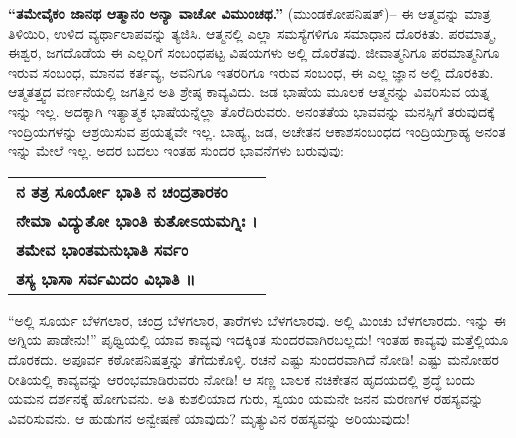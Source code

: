 \textbf{“ತಮೇವೈಕಂ ಜಾನಥ ಆತ್ಮಾನಂ ಅನ್ಯಾ ವಾಚೋ ವಿಮುಂಚಥ.”} (ಮುಂಡಕೋಪನಿಷತ್​)– ಈ ಆತ್ಮವನ್ನು ಮಾತ್ರ ತಿಳಿಯಿರಿ, ಉಳಿದ ವ್ಯರ್ಥಾಲಾಪವನ್ನು ತ್ಯಜಿಸಿ. ಆತ್ಮನಲ್ಲಿ ಎಲ್ಲಾ ಸಮಸ್ಯೆಗಳಿಗೂ ಸಮಾಧಾನ ದೊರಕಿತು. ಪರಮಾತ್ಮ, ಈಶ್ವರ, ಜಗದೊಡೆಯ ಈ ಎಲ್ಲರಿಗೆ ಸಂಬಂಧಪಟ್ಟ ವಿಷಯಗಳು ಅಲ್ಲಿ ದೊರೆತವು. ಜೀವಾತ್ಮನಿಗೂ ಪರಮಾತ್ಮನಿಗೂ ಇರುವ ಸಂಬಂಧ, ಮಾನವ ಕರ್ತವ್ಯ, ಅವನಿಗೂ ಇತರರಿಗೂ ಇರುವ ಸಂಬಂಧ, ಈ ಎಲ್ಲ ಜ್ಞಾನ ಅಲ್ಲಿ ದೊರಕಿತು. ಆತ್ಮತತ್ತ್ವದ ವರ್ಣನೆಯಲ್ಲಿ ಜಗತ್ತಿನ ಅತಿ ಶ್ರೇಷ್ಠ ಕಾವ್ಯವಿದು. ಜಡ ಭಾಷೆಯ ಮೂಲಕ ಆತ್ಮನನ್ನು ವಿವರಿಸುವ ಯತ್ನ ಇನ್ನು ಇಲ್ಲ. ಅದಕ್ಕಾಗಿ ಇತ್ಯಾತ್ಮಕ  ಭಾಷೆಯನ್ನೆಲ್ಲಾ ತೊರೆದಿರುವರು. ಅನಂತತೆಯ ಭಾವವನ್ನು ಮನಸ್ಸಿಗೆ ತರುವುದಕ್ಕೆ ಇಂದ್ರಿಯಗಳನ್ನು ಆಶ್ರಯಿಸುವ ಪ್ರಯತ್ನವೇ ಇಲ್ಲ. ಬಾಹ್ಯ, ಜಡ, ಅಚೇತನ ಆಕಾಶಸಂಬಂಧದ ಇಂದ್ರಿಯಗ್ರಾಹ್ಯ ಅನಂತ ಇನ್ನು ಮೇಲೆ ಇಲ್ಲ. ಅದರ ಬದಲು ಇಂತಹ ಸುಂದರ ಭಾವನೆಗಳು ಬರುವುವು:

\begin{longtable}[r]{@{}l@{}}
\textbf{ನ ತತ್ರ ಸೂರ್ಯೋ ಭಾತಿ ನ ಚಂದ್ರತಾರಕಂ} \\
\textbf{ನೇಮಾ ವಿದ್ಯುತೋ ಭಾಂತಿ ಕುತೋಽಯಮಗ್ನಿಃ ।} \\
\textbf{ತಮೇವ ಭಾಂತಮನುಭಾತಿ ಸರ್ವಂ} \\
\textbf{ತಸ್ಯ ಭಾಸಾ ಸರ್ವಮಿದಂ ವಿಭಾತಿ ॥} \\
\end{longtable}

“ಅಲ್ಲಿ ಸೂರ್ಯ ಬೆಳಗಲಾರ, ಚಂದ್ರ ಬೆಳಗಲಾರ, ತಾರೆಗಳು ಬೆಳಗಲಾರವು. ಅಲ್ಲಿ ಮಿಂಚು ಬೆಳಗಲಾರದು. ಇನ್ನು ಈ ಅಗ್ನಿಯ ಪಾಡೇನು!” ಪೃಥ್ವಿಯಲ್ಲಿ ಯಾವ ಕಾವ್ಯವು ಇದಕ್ಕಿಂತ ಸುಂದರವಾಗಿರಬಲ್ಲದು! ಇಂತಹ ಕಾವ್ಯವು ಮತ್ತೆಲ್ಲಿಯೂ ದೊರಕದು. ಅಪೂರ್ವ ಕಠೋಪನಿಷತ್ತನ್ನು ತೆಗೆದುಕೊಳ್ಳಿ. ರಚನೆ ಎಷ್ಟು ಸುಂದರವಾಗಿದೆ ನೋಡಿ! ಎಷ್ಟು ಮನೋಹರ ರೀತಿಯಲ್ಲಿ ಕಾವ್ಯವನ್ನು ಆರಂಭಮಾಡಿರುವರು ನೋಡಿ! ಆ ಸಣ್ಣ ಬಾಲಕ ನಚಿಕೇತನ ಹೃದಯದಲ್ಲಿ ಶ್ರದ್ಧೆ ಬಂದು ಯಮನ ದರ್ಶನಕ್ಕೆ ಹೋಗುವನು. ಅತಿ ಕುಶಲಿಯಾದ ಗುರು, ಸ್ವಯಂ ಯಮನೇ ಜನನ ಮರಣಗಳ ರಹಸ್ಯವನ್ನು ವಿವರಿಸುವನು. ಆ ಹುಡುಗನ ಅನ್ವೇಷಣೆ ಯಾವುದು? ಮೃತ್ಯುವಿನ ರಹಸ್ಯವನ್ನು ಅರಿಯುವುದು!

